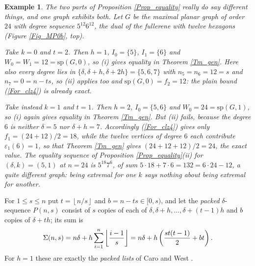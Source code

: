 \documentclass[10pt,a4paper]{article}
\newtheorem{example}[theorem]{Example}
\begin{document}
\begin{example}
\label{Ex_equality}The two parts of Proposition \ref{Prop_equality} really do
say different things, and one graph exhibits both. Let $G$ be the maximal planar graph
of order $24$ with degree sequence $5^{12}6^{12}$, the dual of the fullerene
with twelve hexagons (Figure \ref{Fig_MP0b}, top).

Take $k=0$ and $t=2$. Then $h=1$, $I_{0}=\{5\}$, $I_{1}=\{6\}$ and
$W_{0}=W_{1}=12=\mathrm{sp}(G,0)$, so (i) gives equality in Theorem
\ref{Tm_gen}. Here also every degree lies in
$\{\delta ,\delta +h,\delta +2h\}=\{5,6,7\}$ with $n_{5}=n_{6}=12=s$ and
$n_{7}=0=n-ts$, so (ii) applies too and $\mathrm{sp}(G,0)=f_{2}=12$: the plain
bound (\ref{For_clz4}) is already exact.

Take instead $k=1$ and $t=1$. Then $h=2$, $I_{0}=\{5,6\}$ and
$W_{0}=24=\mathrm{sp}(G,1)$, so (i) again gives equality in Theorem
\ref{Tm_gen}. But (ii) fails, because the degree $6$ is neither $\delta =5$ nor
$\delta +h=7$. Accordingly (\ref{For_clz4}) gives only $f_{1}=(24+12)/2=18$,
while the twelve vertices of degree $6$ each contribute
$\varepsilon _{1}(6)=1$, so that Theorem \ref{Tm_gen} gives $(24+12+12)/2=24$,
the exact value. The equality sequence of Proposition \ref{Prop_equality}(ii)
for $(\delta ,k)=(5,1)$ at $n=24$ is $5^{18}7^{6}$, of sum
$5\cdot 18+7\cdot 6=132=6\cdot 24-12$, a quite different graph: being extremal
for one $k$ says nothing about being extremal for another.
\end{example}



For $1\leq s\leq n$ put $t=\left\lfloor n/s\right\rfloor $ and $b=n-ts\in \lbrack 0,s)$, and let
the \emph{packed} $\delta $-sequence $P(n,s)$ consist of $s$ copies of each of $\delta ,\delta
+h,\ldots ,\delta +(t-1)h$ and $b$ copies of $\delta +th$; its sum is
\[
\Sigma (n,s)=n\delta +h\sum_{i=1}^{n}\left\lfloor \frac{i-1}{s}\right\rfloor =n\delta +h\left( \frac{%
st(t-1)}{2}+bt\right) .
\]
For $h=1$ these are exactly the \emph{packed lists} of Caro and West \cite{CaroWest}.
\end{document}
